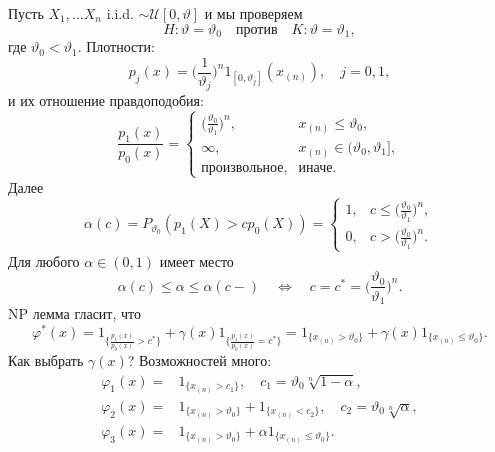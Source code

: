 \begin{exmp} \label{exmp6.18}
	 Пусть $X_1, \dots X_n$ i.i.d. $\sim \mathcal{U}[0, \vartheta]$ и мы проверяем
	 \[ H:\vartheta=\vartheta_0 \quad \text{против} \quad K:\vartheta = \vartheta_1, \]
	 где $\vartheta_0 < \vartheta_1$. Плотности:
	 \[p_j(x) = \Big(\frac{1}{\vartheta_j}\Big)^n 1_{[0, \vartheta_j]} (x_{(n)}), \quad j=0,1, \]
	 и их отношение правдоподобия:
	 \[ \frac{p_1(x)}{p_0(x)}=
	 \left \{
	 \begin{array}{cl}
	 \Big(\frac{\vartheta_0}{\vartheta_1}\Big)^n, & x_{(n)} \leq \vartheta_0, \\
	 \infty, & x_{(n)} \in (\vartheta_0, \vartheta_1], \\
	 \text{произвольное}, & \text{иначе}.
	 \end{array}
	 \right.
	 \]
	 Далее
	 \[\alpha(c)  = P_{\vartheta_0}(p_1(X) > cp_0(X)) = 
	 \left \{
	 \begin{array}{cl}
	 1, & c \leq \Big(\frac{\vartheta_0}{\vartheta_1}\Big)^n, \\
	 0, & c > \Big(\frac{\vartheta_0}{\vartheta_1}\Big)^n.
	 \end{array}
	 \right.
	 \]
	 Для любого $\alpha \in (0, 1)$ имеет место
	 \[ \alpha(c) \leq \alpha \leq \alpha(c-) \quad \Longleftrightarrow \quad c = c^* = \Big(\frac{\vartheta_0}{\vartheta_1}\Big)^n.  \]
	 NP лемма гласит, что
	 \[ \varphi^*(x)=1_{\big\{\frac{p_1(x)}{p_0(x)} > c^*\big \}} + \gamma(x)1_{\big\{\frac{p_1(x)}{p_0(x)} = c^*\big \}} = 1_{\{x_{(n)}>\vartheta_0\}} + \gamma(x)1_{\{x_{(n)} \leq \vartheta_0\}}. \]
	 Как выбрать $\gamma(x)$? Возможностей много:
	 \[
	 \begin{aligned}
	 \varphi_1(x) = & 1_{\{x_{(n)} > c_1\}}, \quad c_1 = \vartheta_0 \sqrt[n]{1-\alpha}, \\
	 \varphi_2(x) = & 1_{\{x_{(n)} > \vartheta_0\}} + 1_{\{x_{(n)} < c_2\}}, \quad c_2 = \vartheta_0 \sqrt[n]{\alpha}, \\
	 \varphi_3(x) = & 1_{\{x_{(n)} > \vartheta_0\}} + \alpha1_{\{x_{(n)} \leq \vartheta_0\}}.
	 \end{aligned}
	 \]
\end{exmp}

